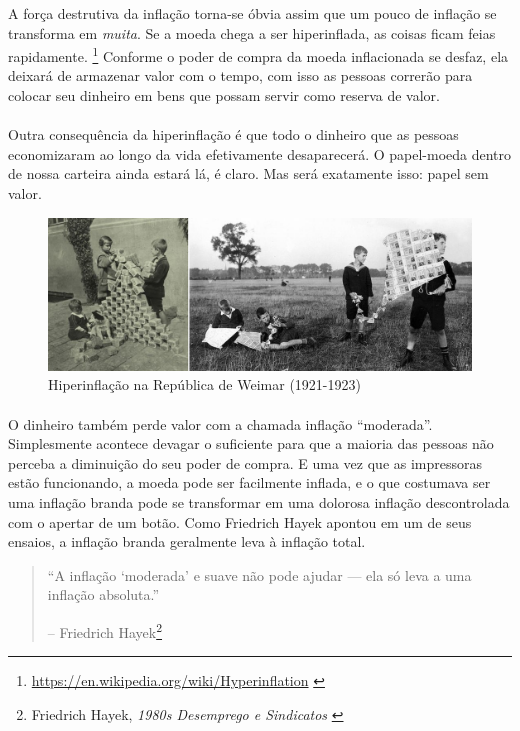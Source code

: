 A força destrutiva da inflação torna-se óbvia assim que um pouco de inflação se transforma em \textit{muita}. Se a moeda chega a ser hiperinflada, as coisas ficam feias rapidamente. \footnote{\url{https://en.wikipedia.org/wiki/Hyperinflation} \cite{wiki:hyperinflation}} Conforme o poder de compra da moeda inflacionada se desfaz, ela deixará de armazenar valor com o tempo, com isso as pessoas correrão para colocar seu dinheiro em bens que possam servir como reserva de valor.

\paragraph{}
Outra consequência da hiperinflação é que todo o dinheiro que as pessoas economizaram ao longo da vida efetivamente desaparecerá. O papel-moeda dentro de nossa carteira ainda estará lá, é claro. Mas será exatamente isso: papel sem valor.

\begin{figure}
  \includegraphics{assets/images/children-playing-with-money.png}
  \caption{Hiperinflação na República de Weimar (1921-1923)}
  \label{fig:children-playing-with-money}
\end{figure}

\paragraph{}
O dinheiro também perde valor com a chamada inflação \enquote{moderada}. Simplesmente acontece devagar o suficiente para que a maioria das pessoas não perceba a diminuição do seu poder de compra. E uma vez que as impressoras estão funcionando, a moeda pode ser facilmente inflada, e o que costumava ser uma inflação branda pode se transformar em uma dolorosa inflação descontrolada com o apertar de um botão. Como Friedrich Hayek apontou em um de seus ensaios, a inflação branda geralmente leva à inflação total.

\begin{quotation}\begin{samepage}
\enquote{A inflação `moderada' e suave não pode ajudar --- ela só leva a uma inflação absoluta.}
\begin{flushright} -- Friedrich Hayek\footnote{Friedrich Hayek, \textit{1980s
Desemprego e Sindicatos} \cite{hayek-inflation}}
\end{flushright}\end{samepage}\end{quotation}

